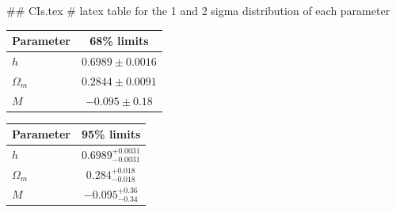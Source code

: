 ## CIs.tex
# latex table for the 1 and 2 sigma distribution of each parameter

\begin{tabular} { l  c}
 Parameter &  68\% limits\\
\hline
{\boldmath$h              $} & $0.6989\pm 0.0016          $\\
{\boldmath$\Omega_m       $} & $0.2844\pm 0.0091          $\\
{\boldmath$M              $} & $-0.095\pm 0.18            $\\
\hline
\end{tabular}

\begin{tabular} { l  c}
 Parameter &  95\% limits\\
\hline
{\boldmath$h              $} & $0.6989^{+0.0031}_{-0.0031}$\\
{\boldmath$\Omega_m       $} & $0.284^{+0.018}_{-0.018}   $\\
{\boldmath$M              $} & $-0.095^{+0.36}_{-0.34}    $\\
\hline
\end{tabular}
